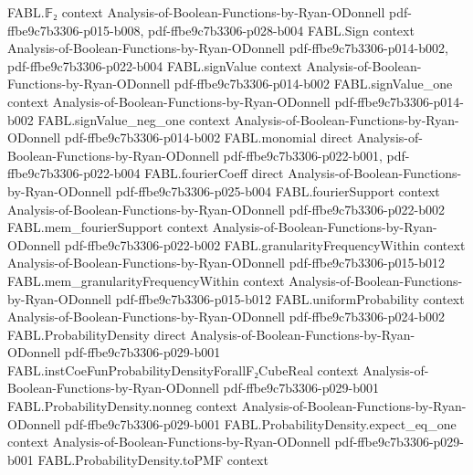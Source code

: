 \begin{theorem}
\label{FABL.convolution_comm}
\leanok
{}
\proofstep
  {FABL.𝔽₂}
  {context}
  {Analysis-of-Boolean-Functions-by-Ryan-ODonnell}
  {pdf-ffbe9c7b3306-p015-b008,
    pdf-ffbe9c7b3306-p028-b004}
\proofstep
  {FABL.Sign}
  {context}
  {Analysis-of-Boolean-Functions-by-Ryan-ODonnell}
  {pdf-ffbe9c7b3306-p014-b002,
    pdf-ffbe9c7b3306-p022-b004}
\proofstep
  {FABL.signValue}
  {context}
  {Analysis-of-Boolean-Functions-by-Ryan-ODonnell}
  {pdf-ffbe9c7b3306-p014-b002}
\proofstep
  {FABL.signValue_one}
  {context}
  {Analysis-of-Boolean-Functions-by-Ryan-ODonnell}
  {pdf-ffbe9c7b3306-p014-b002}
\proofstep
  {FABL.signValue_neg_one}
  {context}
  {Analysis-of-Boolean-Functions-by-Ryan-ODonnell}
  {pdf-ffbe9c7b3306-p014-b002}
\proofstep
  {FABL.monomial}
  {direct}
  {Analysis-of-Boolean-Functions-by-Ryan-ODonnell}
  {pdf-ffbe9c7b3306-p022-b001,
    pdf-ffbe9c7b3306-p022-b004}
\proofstep
  {FABL.fourierCoeff}
  {direct}
  {Analysis-of-Boolean-Functions-by-Ryan-ODonnell}
  {pdf-ffbe9c7b3306-p025-b004}
\proofstep
  {FABL.fourierSupport}
  {context}
  {Analysis-of-Boolean-Functions-by-Ryan-ODonnell}
  {pdf-ffbe9c7b3306-p022-b002}
\proofstep
  {FABL.mem_fourierSupport}
  {context}
  {Analysis-of-Boolean-Functions-by-Ryan-ODonnell}
  {pdf-ffbe9c7b3306-p022-b002}
\proofstep
  {FABL.granularityFrequencyWithin}
  {context}
  {Analysis-of-Boolean-Functions-by-Ryan-ODonnell}
  {pdf-ffbe9c7b3306-p015-b012}
\proofstep
  {FABL.mem_granularityFrequencyWithin}
  {context}
  {Analysis-of-Boolean-Functions-by-Ryan-ODonnell}
  {pdf-ffbe9c7b3306-p015-b012}
\proofstep
  {FABL.uniformProbability}
  {context}
  {Analysis-of-Boolean-Functions-by-Ryan-ODonnell}
  {pdf-ffbe9c7b3306-p024-b002}
\proofstep
  {FABL.ProbabilityDensity}
  {direct}
  {Analysis-of-Boolean-Functions-by-Ryan-ODonnell}
  {pdf-ffbe9c7b3306-p029-b001}
\proofstep
  {FABL.instCoeFunProbabilityDensityForallF₂CubeReal}
  {context}
  {Analysis-of-Boolean-Functions-by-Ryan-ODonnell}
  {pdf-ffbe9c7b3306-p029-b001}
\proofstep
  {FABL.ProbabilityDensity.nonneg}
  {context}
  {Analysis-of-Boolean-Functions-by-Ryan-ODonnell}
  {pdf-ffbe9c7b3306-p029-b001}
\proofstep
  {FABL.ProbabilityDensity.expect_eq_one}
  {context}
  {Analysis-of-Boolean-Functions-by-Ryan-ODonnell}
  {pdf-ffbe9c7b3306-p029-b001}
\proofstep
  {FABL.ProbabilityDensity.toPMF}
  {context}

\end{theorem}
